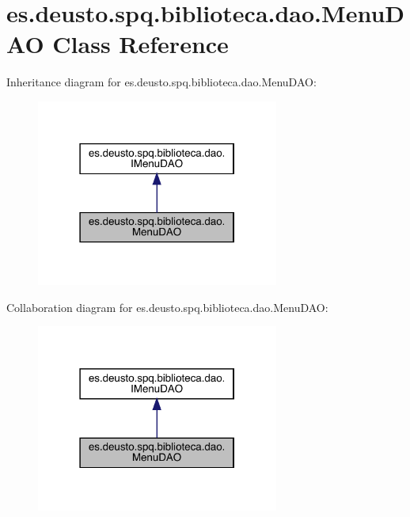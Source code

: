 \hypertarget{classes_1_1deusto_1_1spq_1_1biblioteca_1_1dao_1_1_menu_d_a_o}{}\section{es.\+deusto.\+spq.\+biblioteca.\+dao.\+Menu\+D\+AO Class Reference}
\label{classes_1_1deusto_1_1spq_1_1biblioteca_1_1dao_1_1_menu_d_a_o}


Inheritance diagram for es.\+deusto.\+spq.\+biblioteca.\+dao.\+Menu\+D\+AO\+:
\nopagebreak
\begin{figure}[H]
\begin{center}
\leavevmode
\includegraphics[width=226pt]{classes_1_1deusto_1_1spq_1_1biblioteca_1_1dao_1_1_menu_d_a_o__inherit__graph}
\end{center}
\end{figure}


Collaboration diagram for es.\+deusto.\+spq.\+biblioteca.\+dao.\+Menu\+D\+AO\+:
\nopagebreak
\begin{figure}[H]
\begin{center}
\leavevmode
\includegraphics[width=226pt]{classes_1_1deusto_1_1spq_1_1biblioteca_1_1dao_1_1_menu_d_a_o__coll__graph}
\end{center}
\end{figure}
